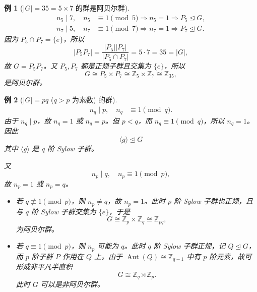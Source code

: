 \documentclass[11pt,a4paper]{ctexart}
\newtheorem*{example}{例}
\theoremstyle{remark}
\begin{document}
\begin{example}[\(|G| = 35 = 5 \times 7\) 的群是阿贝尔群]
\begin{align*}
    n_5 \mid 7, \quad n_5 &\equiv 1 \pmod 5 \Rightarrow n_5 = 1 \Rightarrow P_5 \trianglelefteq G, \\
    n_7 \mid 5, \quad n_7 &\equiv 1 \pmod 7 \Rightarrow n_7 = 1 \Rightarrow P_7 \trianglelefteq G.
\end{align*}
因为 \(P_5\cap P_7=\{e\}\)，所以
\[
|P_5P_7|=\frac{|P_5||P_7|}{|P_5\cap P_7|}=5\cdot 7=35=|G|,
\]
故 \(G=P_5P_7\)。又 \(P_5,P_7\) 都是正规子群且交集为 \(\{e\}\)，所以
\[
G \cong P_5 \times P_7 \cong \mathbb{Z}_5 \times \mathbb{Z}_7 \cong \mathbb{Z}_{35},
\]
是阿贝尔群。
\end{example}

\begin{example}[\(|G| = pq\) (\(q > p\) 为素数) 的群]
\begin{align*}
    n_q \mid p, \quad n_q &\equiv 1 \pmod q.
\end{align*}
由于 \(n_q\mid p\)，故 \(n_q=1\) 或 \(n_q=p\)。但 \(p<q\)，而 \(n_q\equiv1\pmod q\)，所以 \(n_q=1\)。因此
\[
\langle g\rangle \trianglelefteq G
\]
其中 \(\langle g\rangle\) 是 \(q\) 阶 Sylow 子群。

又
\[
n_p \mid q, \quad n_p \equiv 1 \pmod p,
\]
故 \(n_p=1\) 或 \(n_p=q\)。
\begin{itemize}
    \item 若 \(q \not\equiv 1 \pmod p\)，则 \(n_p\neq q\)，故 \(n_p=1\)。此时 \(p\) 阶 Sylow 子群也正规，且与 \(q\) 阶 Sylow 子群交集为 \(\{e\}\)，于是
    \[
    G \cong \mathbb{Z}_p \times \mathbb{Z}_q \cong \mathbb{Z}_{pq},
    \]
    为阿贝尔群。
    \item 若 \(q \equiv 1 \pmod p\)，则 \(n_p\) 可能为 \(q\)。此时 \(q\) 阶 Sylow 子群正规，记 \(Q\trianglelefteq G\)，而 \(p\) 阶子群 \(P\) 作用在 \(Q\) 上。由于 \(\operatorname{Aut}(Q)\cong \mathbb{Z}_{q-1}\) 中有 \(p\) 阶元素，故可形成非平凡半直积
    \[
    G \cong \mathbb{Z}_q \rtimes \mathbb{Z}_p.
    \]
    此时 \(G\) 可以是非阿贝尔群。
\end{itemize}
\end{example}
\end{document}

